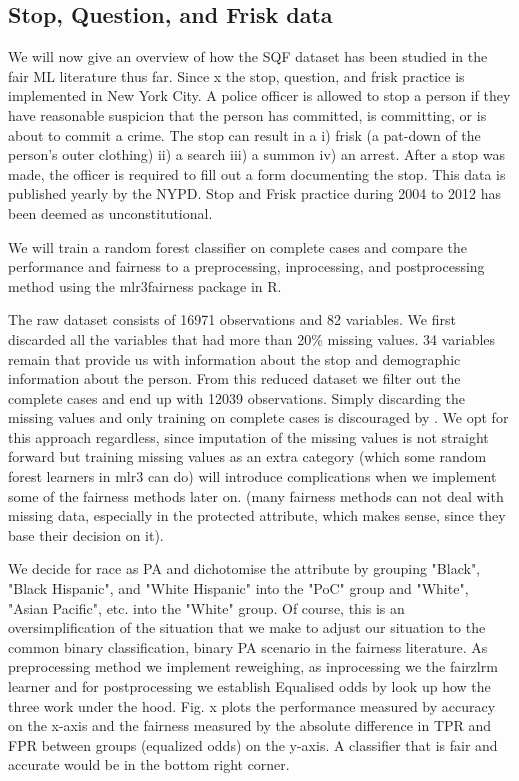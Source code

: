 \subsection*{Stop, Question, and Frisk data}
We will now give an overview of how the SQF dataset has been studied in the fair ML literature thus far.
Since x the stop, question, and frisk practice is implemented in New York City. A police officer is allowed to stop a person if they have reasonable suspicion that the person has committed, is committing, or is about to commit a crime.
The stop can result in a i) frisk (a pat-down of the person's outer clothing)
ii) a search iii) a summon iv) an arrest. After a stop was made, the officer is required to fill out a form
documenting the stop. This data is published yearly by the NYPD. Stop and Frisk practice during 2004 to 2012 has been deemed as unconstitutional.

We will train a random forest classifier on complete cases and compare the performance and fairness to a preprocessing, inprocessing, and postprocessing method using the mlr3fairness package in R.


The raw dataset consists of 16971 observations and 82 variables. We first discarded all the variables that had more than 20\% missing values.
34 variables remain that provide us with information about the stop and demographic information about the person. From this reduced dataset we filter out the complete cases and end up with 12039 observations.
Simply discarding the missing values and only training on complete cases is discouraged by \cite{fernando2021}. We opt for this approach regardless, since imputation of the missing values is not straight forward
but training missing values as an extra category (which some random forest learners in mlr3 can do) will introduce complications when we implement some of the fairness methods later on.
(many fairness methods can not deal with missing data, especially in the protected attribute, which makes sense, since they base their decision on it). 

We decide for race as PA and dichotomise the attribute by grouping "Black", "Black Hispanic", and "White Hispanic" into the "PoC" group and "White", "Asian Pacific", etc. into the "White" group.
Of course, this is an oversimplification of the situation that we make to adjust our situation to the common binary classification, binary PA scenario in the fairness literature.
As preprocessing method we implement reweighing, as inprocessing we the fairzlrm learner and for postprocessing we establish Equalised odds by {\color{red} {look up how the three work under the hood}}.
Fig. x plots the performance measured by accuracy on the x-axis and the fairness measured by the absolute difference in TPR and FPR between groups (equalized odds) on the y-axis. A classifier that is fair and accurate would be in the bottom right corner.

